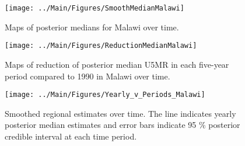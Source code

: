 \documentclass[12pt]{article}\usepackage[]{graphicx}\usepackage[]{color}
\newenvironment{knitrout}{}{} %
\begin{document}
\begin{knitrout}
\color{fgcolor}\begin{figure}[bht]

{\centering \texttt{[image: ../Main/Figures/SmoothMedianMalawi]} 

}

\caption[Maps of posterior medians for Malawi  over time]{Maps of posterior medians for Malawi  over time.}\label{fig:unnamed-chunk-204}
\end{figure}


\end{knitrout}
\begin{knitrout}
\color{fgcolor}\begin{figure}[bht]

{\centering \texttt{[image: ../Main/Figures/ReductionMedianMalawi]} 

}

\caption[Maps of reduction of posterior median U5MR in each five-year period compared to 1990 in Malawi over time]{Maps of reduction of posterior median U5MR in each five-year period compared to 1990 in Malawi over time.}\label{fig:unnamed-chunk-205}
\end{figure}


\end{knitrout}
\begin{knitrout}
\color{fgcolor}\begin{figure}[bht]

{\centering \texttt{[image: ../Main/Figures/Yearly\_v\_Periods\_Malawi]} 

}

\caption[Smoothed regional estimates over time]{Smoothed regional estimates over time. The line indicates yearly posterior median estimates and error bars indicate 95 \% posterior credible interval at each time period.}\label{fig:unnamed-chunk-206}
\end{figure}


\end{knitrout}
\end{document}
